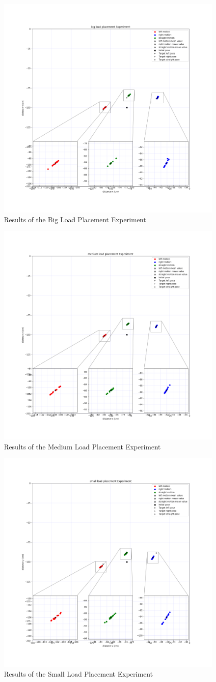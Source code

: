 \begin{figure}[ht!]
	\centering
	\includegraphics[width=0.6\linewidth]{images/big}
	\caption{Results of the Big Load Placement Experiment}
	\label{fig:big}
\end{figure}
\begin{figure}[ht!]
	\centering
	\includegraphics[width=0.6\linewidth]{images/medium}
	\caption{Results of the Medium Load Placement Experiment}
	\label{fig:medium}
\end{figure}
\begin{figure}[ht!]
	\centering
	\includegraphics[width=0.6\linewidth]{images/small}
	\caption{Results of the Small Load Placement Experiment}
	\label{fig:small}
\end{figure}



